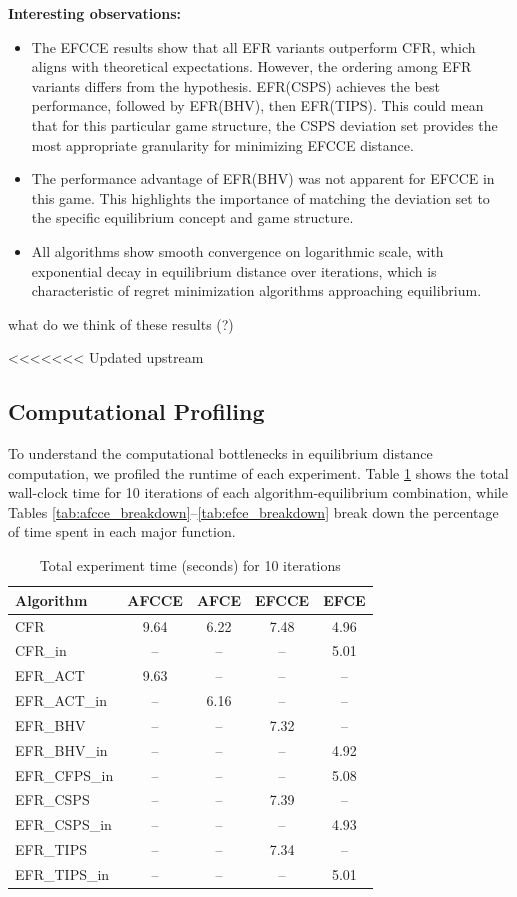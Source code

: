 \documentclass[11pt]{article}
\begin{document}
\textbf{Interesting observations:}
\begin{itemize}
    \item The EFCCE results show that all EFR variants outperform CFR, which aligns with theoretical expectations. However, the ordering among EFR variants differs from the hypothesis. EFR(CSPS) achieves the best performance, followed by EFR(BHV), then EFR(TIPS). This could mean that for this particular game structure, the CSPS deviation set provides the most appropriate granularity for minimizing EFCCE distance.

    \item The performance advantage of EFR(BHV) was not apparent for EFCCE in this game. This highlights the importance of matching the deviation set to the specific equilibrium concept and game structure.

    \item All algorithms show smooth convergence on logarithmic scale, with exponential decay in equilibrium distance over iterations, which is characteristic of regret minimization algorithms approaching equilibrium.
\end{itemize}

what do we think of these results (?)

<<<<<<< Updated upstream
\subsection{Computational Profiling}

To understand the computational bottlenecks in equilibrium distance computation, we profiled the runtime of each experiment. Table \ref{tab:total_time} shows the total wall-clock time for 10 iterations of each algorithm-equilibrium combination, while Tables \ref{tab:afcce_breakdown}--\ref{tab:efce_breakdown} break down the percentage of time spent in each major function.

\begin{table}[H]
\centering
\caption{Total experiment time (seconds) for 10 iterations}
\label{tab:total_time}
\begin{tabular}{lcccc}
\toprule
Algorithm & AFCCE & AFCE & EFCCE & EFCE \\
\midrule
CFR & 9.64 & 6.22 & 7.48 & 4.96 \\
CFR\_in & -- & -- & -- & 5.01 \\
EFR\_ACT & 9.63 & -- & -- & -- \\
EFR\_ACT\_in & -- & 6.16 & -- & -- \\
EFR\_BHV & -- & -- & 7.32 & -- \\
EFR\_BHV\_in & -- & -- & -- & 4.92 \\
EFR\_CFPS\_in & -- & -- & -- & 5.08 \\
EFR\_CSPS & -- & -- & 7.39 & -- \\
EFR\_CSPS\_in & -- & -- & -- & 4.93 \\
EFR\_TIPS & -- & -- & 7.34 & -- \\
EFR\_TIPS\_in & -- & -- & -- & 5.01 \\
\bottomrule
\end{tabular}
\end{table}
\end{document}
